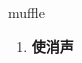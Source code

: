 
\begin{frame}
{\huge muffle}
\begin{center}
\begin{enumerate}\Large
  \item \textbf{使消声}
\end{enumerate}
\end{center}
\end{frame}

